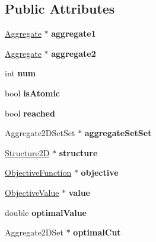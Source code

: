 \subsection*{Public Attributes}
\begin{DoxyCompactItemize}
\item 
\hypertarget{classAggregate2D_af2c3b6d9af903a0c2d15339db95ffd34}{\hyperlink{classAggregate}{Aggregate} $\ast$ {\bfseries aggregate1}}\label{classAggregate2D_af2c3b6d9af903a0c2d15339db95ffd34}

\item 
\hypertarget{classAggregate2D_acb13b5fe017f4ce25a20d79b407af5d1}{\hyperlink{classAggregate}{Aggregate} $\ast$ {\bfseries aggregate2}}\label{classAggregate2D_acb13b5fe017f4ce25a20d79b407af5d1}

\item 
\hypertarget{classAggregate2D_a71b116cd7b68c3d41cdd24938199671a}{int {\bfseries num}}\label{classAggregate2D_a71b116cd7b68c3d41cdd24938199671a}

\item 
\hypertarget{classAggregate2D_a37ca87b9bddb83e67b8a663447c4e250}{bool {\bfseries is\-Atomic}}\label{classAggregate2D_a37ca87b9bddb83e67b8a663447c4e250}

\item 
\hypertarget{classAggregate2D_afe0a21bc8fd8c6af02e871f7824f52be}{bool {\bfseries reached}}\label{classAggregate2D_afe0a21bc8fd8c6af02e871f7824f52be}

\item 
\hypertarget{classAggregate2D_a647d9de4cf18427dc04c640ee9da0b91}{Aggregate2\-D\-Set\-Set $\ast$ {\bfseries aggregate\-Set\-Set}}\label{classAggregate2D_a647d9de4cf18427dc04c640ee9da0b91}

\item 
\hypertarget{classAggregate2D_aa830463350249ffb065af3861433c160}{\hyperlink{classStructure2D}{Structure2\-D} $\ast$ {\bfseries structure}}\label{classAggregate2D_aa830463350249ffb065af3861433c160}

\item 
\hypertarget{classAggregate2D_a03eb65ce7ac81bd0f55be1fe62b312e1}{\hyperlink{classObjectiveFunction}{Objective\-Function} $\ast$ {\bfseries objective}}\label{classAggregate2D_a03eb65ce7ac81bd0f55be1fe62b312e1}

\item 
\hypertarget{classAggregate2D_ac57eb46dd03c7836636dd36090fa5b1b}{\hyperlink{classObjectiveValue}{Objective\-Value} $\ast$ {\bfseries value}}\label{classAggregate2D_ac57eb46dd03c7836636dd36090fa5b1b}

\item 
\hypertarget{classAggregate2D_a3933eb6bf1b8a59026b7e753328168da}{double {\bfseries optimal\-Value}}\label{classAggregate2D_a3933eb6bf1b8a59026b7e753328168da}

\item 
\hypertarget{classAggregate2D_ad6405290e7c8a1eedd73c23cc10a6547}{Aggregate2\-D\-Set $\ast$ {\bfseries optimal\-Cut}}\label{classAggregate2D_ad6405290e7c8a1eedd73c23cc10a6547}

\end{DoxyCompactItemize}


